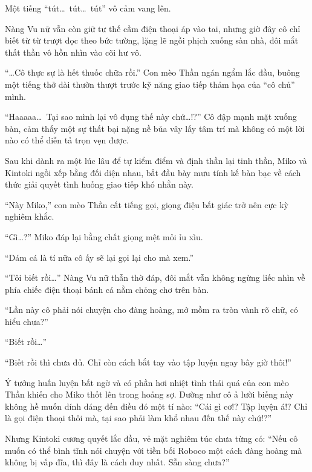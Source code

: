 \documentclass[../main.tex]{subfiles}
\begin{document}
Một tiếng ``tút\dots\ tút\dots\ tút'' vô cảm vang lên.

Nàng Vu nữ vẫn còn giữ tư thế cầm điện thoại áp vào tai, nhưng giờ đây cô chỉ biết từ từ trượt dọc theo bức tường, lặng lẽ ngồi phịch xuống sàn nhà, đôi mắt thất thần vô hồn nhìn vào cõi hư vô.

``\dots Cô thực sự là hết thuốc chữa rồi.'' Con mèo Thần ngán ngẩm lắc đầu, buông một tiếng thở dài thườn thượt trước kỹ năng giao tiếp thảm họa của ``cô chủ'' mình.

``Haaaaa\dots\ Tại sao mình lại vô dụng thế này chứ\dots!?'' Cô đập mạnh mặt xuống bàn, cảm thấy một sự thất bại nặng nề bủa vây lấy tâm trí mà không có một lời nào có thể diễn tả trọn vẹn được.


\ct

Sau khi dành ra một lúc lâu để tự kiểm điểm và định thần lại tinh thần, Miko và Kintoki ngồi xếp bằng đối diện nhau, bắt đầu bày mưu tính kế bàn bạc về cách thức giải quyết tình huống giao tiếp khó nhằn này.

``Này Miko,'' con mèo Thần cất tiếng gọi, giọng điệu bất giác trở nên cực kỳ nghiêm khắc.

``Gì\dots?'' Miko đáp lại bằng chất giọng mệt mỏi ỉu xìu.

``Dám cá là tí nữa cô ấy sẽ lại gọi lại cho mà xem.''


``Tôi biết rồi\dots'' Nàng Vu nữ thẫn thờ đáp, đôi mắt vẫn không ngừng liếc nhìn về phía chiếc điện thoại bánh cá nằm chỏng chơ trên bàn.

``Lần này cô phải nói chuyện cho đàng hoàng, mở mồm ra tròn vành rõ chữ, có hiểu chưa?''

``Biết rồi\dots''

``Biết rồi thì chưa đủ. Chỉ còn cách bắt tay vào tập luyện ngay bây giờ thôi!''

Ý tưởng huấn luyện bất ngờ và có phần hơi nhiệt tình thái quá của con mèo Thần khiến cho Miko thốt lên trong hoảng sợ. Dường như cô ả lười biếng này không hề muốn dính dáng đến điều đó một tí nào: ``Cái gì cơ!? Tập luyện á!? Chỉ là gọi điện thoại thôi mà, tại sao phải làm khổ nhau đến thế này chứ!?''

Nhưng Kintoki cương quyết lắc đầu, vẻ mặt nghiêm túc chưa từng có: ``Nếu cô muốn có thể bình tĩnh nói chuyện với tiền bối Roboco một cách đàng hoàng mà không bị vấp đĩa, thì đây là cách duy nhất. Sẵn sàng chưa?''

\end{document}
